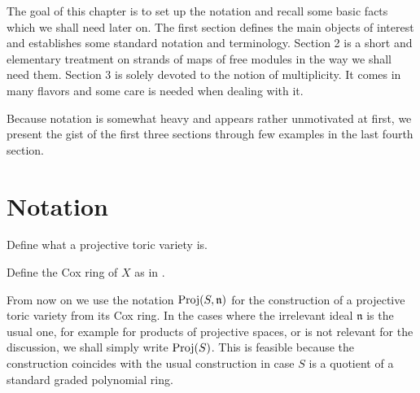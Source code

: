 \documentclass[fleqn,reqno]{amsart}
\newcounter{chapter}
\numberwithin{first}{chapter}
\begin{document}

\begin{paragraf}
\label{par:preliminaries-intro}
The goal of this chapter is to set up the notation and recall some basic facts
which we shall need later on.
The first section defines the main objects of interest and establishes some
standard notation and terminology.
Section 2 is a short and elementary treatment on strands of maps of free modules
in the way we shall need them.
Section 3 is solely devoted to the notion of multiplicity.
It comes in many flavors and some care is needed when dealing with it.

Because notation is somewhat heavy and appears rather unmotivated at first,
we present the gist of the first three sections through few examples in the last fourth section.
\end{paragraf}



\section{Notation}

\begin{paragraf}
\label{par:toric-variety}
Define what a projective toric variety is.
\end{paragraf}

\begin{paragraf}
\label{par:cox-ring}
Define the Cox ring of $X$ as in \citet{93-Cox-ring}.
\end{paragraf}

\begin{paragraf}
From now on we use the notation $\operatorname{Proj}(S,\mathfrak n)$ for the construction of a projective toric variety from
its Cox ring. In the cases where the irrelevant ideal $\mathfrak n$ is the usual one,
for example for products of projective spaces, or is not relevant for the discussion,
we shall simply write $\operatorname{Proj}(S)$.
This is feasible because the construction coincides with the usual construction
in case $S$ is a quotient of a standard graded polynomial ring.
\end{paragraf}
\end{document}
